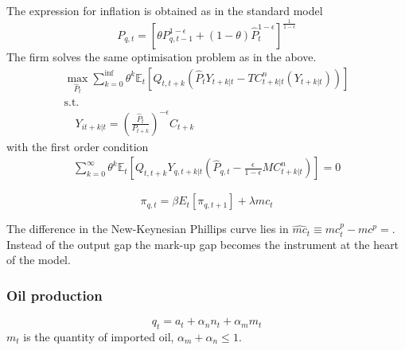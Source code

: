 \documentclass[12pt,a4paper,english]{article} %
\newcommand{\E}{\mathbb{E}} %
\begin{document}
	The expression for inflation is obtained as in the standard model
	\begin{equation}
		P_{q,t} = 
		\left[ 
		\theta P_{q,t-1}^{1 - \epsilon} + (1 - \theta) \hat{P}_t^{1 - \epsilon}
		\right]^{\frac{1}{1 - \epsilon}}
	\end{equation}
	The firm solves the same optimisation problem as in the above. 
		\begin{equation}
		\begin{aligned}
			\max_{\hat{P}_t}
			\sum_{k=0}^{\inf} \theta^k \E_t 
			\left[
			Q_{t, t+k} 
			\left(
			\hat{P}_t Y_{t+k|t} - TC_{t+k|t}^n(Y_{t+k|t})
			\right)
			\right] \\
			\textrm{s.t.}\\
			\quad
			Y_{it+k|t} = \left(\frac{\hat{P}_t}{P_{t+k}} \right)^{-\epsilon} C_{t+k}
		\end{aligned}
	\end{equation}
	with the first order condition 
	\begin{equation}
		\begin{aligned}
			\sum_{k=0}^{\infty} \theta^k \E_t 
			\left[
			Q_{t,t+k} Y_{q,t+k|t} 
			\left(
			\hat{P}_{q,t} - \frac{\epsilon}{1 - \epsilon} MC_{t+k|t}^n
			\right)
			\right]
			= 0
		\end{aligned}
	\end{equation}
	
	\begin{equation}
		\pi_{q,t} = \beta E_t [\pi_{q,t+1}] + \lambda \hat{mc}_{t}
	\end{equation}
	
	The difference in the New-Keynesian Phillips curve lies in $\hat{mc}_t \equiv mc_t^p - mc^p = $. Instead of the output gap the mark-up gap becomes the instrument at the heart of the model.
	
	
	
	
	
	
	
	
	
	
	
	
	
	
	
	
	
	
	
	
	\subsubsection{Oil production}
	\begin{equation}
		q_t = a_t + \alpha_n n_t + \alpha_m m_t
	\end{equation}
	$m_t$ is the quantity of imported oil, $\alpha_m + \alpha_n \leq 1$.\\
	\\
\end{document}
